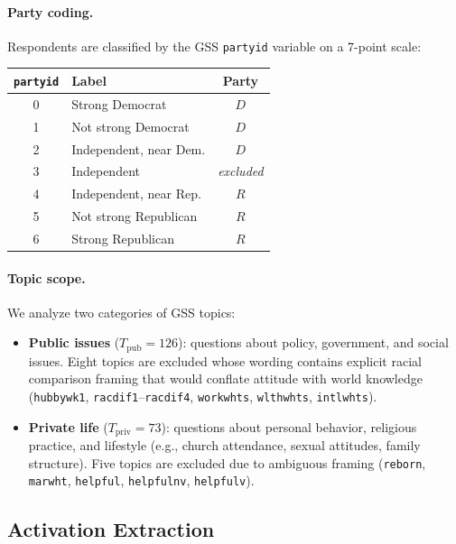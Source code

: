 \paragraph{Party coding.}
Respondents are classified by the GSS \texttt{partyid} variable on a 7-point scale:
\begin{center}
\begin{tabular}{clc}
\toprule
\texttt{partyid} & Label & Party \\
\midrule
0 & Strong Democrat           & $D$ \\
1 & Not strong Democrat       & $D$ \\
2 & Independent, near Dem.    & $D$ \\
3 & Independent               & \textit{excluded} \\
4 & Independent, near Rep.    & $R$ \\
5 & Not strong Republican     & $R$ \\
6 & Strong Republican         & $R$ \\
\bottomrule
\end{tabular}
\end{center}

\paragraph{Topic scope.}
We analyze two categories of GSS topics:
\begin{itemize}
    \item \textbf{Public issues} ($T_\text{pub} = 126$): questions about policy, government, and social issues. Eight topics are excluded whose wording contains explicit racial comparison framing that would conflate attitude with world knowledge (\texttt{hubbywk1}, \texttt{racdif1}--\texttt{racdif4}, \texttt{workwhts}, \texttt{wlthwhts}, \texttt{intlwhts}).
    \item \textbf{Private life} ($T_\text{priv} = 73$): questions about personal behavior, religious practice, and lifestyle (e.g., church attendance, sexual attitudes, family structure). Five topics are excluded due to ambiguous framing (\texttt{reborn}, \texttt{marwht}, \texttt{helpful}, \texttt{helpfulnv}, \texttt{helpfulv}).
\end{itemize}

\subsection{Activation Extraction}
\label{sec:extraction}

